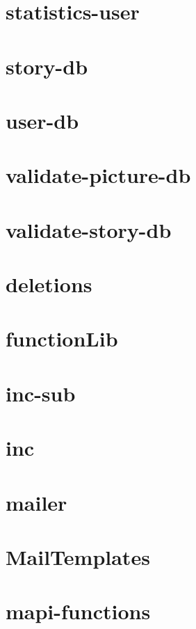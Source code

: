\section{statistics-user}

\newpage
\section{story-db}

\newpage
\section{user-db}

\newpage
\section{validate-picture-db}

\newpage
\section{validate-story-db}

\newpage
\section{deletions}

\newpage
\section{functionLib}

\newpage
\section{inc-sub}

\newpage
\section{inc}

\newpage
\section{mailer}

\newpage
\section{MailTemplates}

\newpage
\section{mapi-functions}

\newpage
